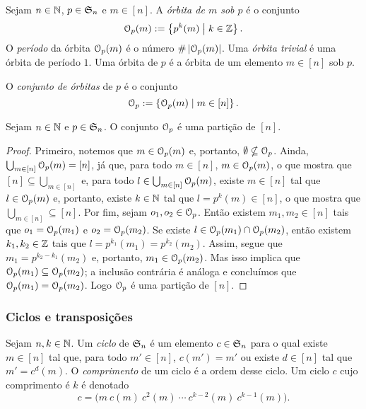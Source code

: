 \begin{definition}
	Sejam $n \in \mathbb{N}$, $p \in \mathfrak{S}_n$ e $m \in [n]$. A \emph{órbita de $m$ sob $p$} é o conjunto
	\begin{equation*}
	\mathcal{O}_p(m) := \left\{{p^k(m)}\;\middle\vert\;{k \in \mathbb{Z}}\right\}.
	\end{equation*}
O \emph{período} da órbita $\mathcal{O}_p(m)$ é o número $\#\left\lvert{\mathcal{O}_p(m)}\right\rvert$. Uma \emph{órbita trivial} é uma órbita de período $1$. Uma órbita de $p$ é a órbita de um elemento $m \in [n]$ sob $p$.

	O \emph{conjunto de órbitas} de $p$ é o conjunto
	\begin{equation*}
	\mathcal{O}_p := \left\{{\mathcal{O}_p(m)}\;\middle\vert\;{m \in [n]}\right\}.
	\end{equation*}
\end{definition}

\begin{proposition}
	Sejam $n \in \mathbb{N}$ e $p \in \mathfrak{S}_n$. O conjunto $\mathcal{O}_p$ é uma partição de $[n]$.
\end{proposition}
\begin{proof}
	Primeiro, notemos que $m \in \mathcal{O}_p(m)$ e, portanto, $\emptyset \nsubseteq \mathcal{O}_p$. Ainda, $\bigcup_{m \in [n]} \mathcal{O}_p(m) = [n]$, já que, para todo $m \in [n]$, $m \in \mathcal{O}_p(m)$, o que mostra que $[n] \subseteq \bigcup_{m \in [n]}$ e, para todo $l \in \bigcup_{m \in [n]} \mathcal{O}_p(m)$, existe $m \in [n]$ tal que $l \in \mathcal{O}_p(m)$ e, portanto, existe $k \in \mathbb{N}$ tal que $l=p^k(m) \in [n]$, o que mostra que $\bigcup_{m \in [n]} \subseteq [n]$. Por fim, sejam $o_1,o_2 \in \mathcal{O}_p$. Então existem $m_1,m_2 \in [n]$ tais que $o_1=\mathcal{O}_p(m_1)$ e $o_2=\mathcal{O}_p(m_2)$. Se existe $l \in \mathcal{O}_p(m_1) \cap \mathcal{O}_p(m_2)$, então existem $k_1,k_2 \in \mathbb{Z}$ tais que $l=p^{k_1}(m_1)=p^{k_2}(m_2)$. Assim, segue que $m_1=p^{k_2-k_1}(m_2)$ e, portanto, $m_1 \in \mathcal{O}_p(m_2)$. Mas isso implica que $\mathcal{O}_p(m_1) \subseteq \mathcal{O}_p(m_2)$; a inclusão contrária é análoga e concluímos que $\mathcal{O}_p(m_1) = \mathcal{O}_p(m_2)$. Logo $\mathcal{O}_p$ é uma partição de $[n]$.
\end{proof}

\subsubsection{Ciclos e transposições}

\begin{definition}
	Sejam $n,k \in \mathbb{N}$. Um \emph{ciclo} de $\mathfrak{S}_n$ é um elemento $c \in \mathfrak{S}_n$ para o qual existe $m \in [n]$ tal que, para todo $m' \in [n]$, $c(m')=m'$ ou existe $d \in [n]$ tal que $m'=c^d(m)$. O \emph{comprimento} de um ciclo é a ordem desse ciclo. Um ciclo $c$ cujo comprimento é $k$ é denotado
	\begin{equation*}
	c = \bigl(m \ c(m) \ c^2(m) \ \cdots \  c^{k-2}(m) \ c^{k-1}(m)\bigr).
	\end{equation*}
\end{definition}


